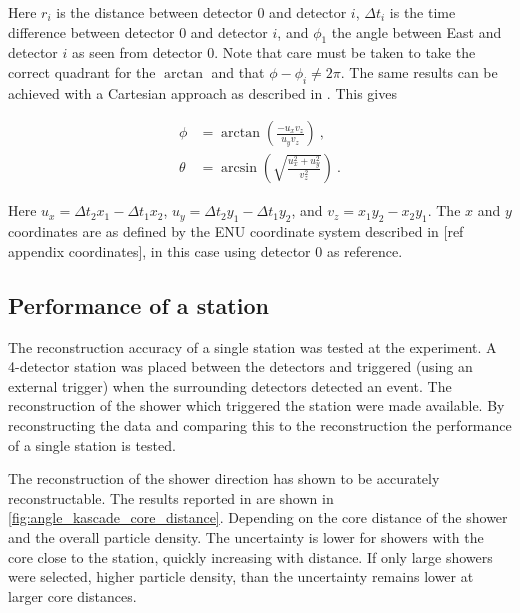 Here $r_i$ is the distance between detector 0 and detector $i$, $\Delta t_i$ is the time difference between detector 0 and detector $i$, and $\phi_1$ the angle between East and detector $i$ as seen from detector 0. Note that care must be taken to take the correct quadrant for the $\arctan$ and that $\phi - \phi_i \ne 2 \pi$. The same results can be achieved with a Cartesian approach as described in \cite{montanus2015direction}. This gives

\begin{equation}
    \label{eq:direction-2dflat}
    \begin{split}
        \phi &= \arctan \left(\frac{-u_x v_z}{u_y v_z} \right) \ , \\
        \theta &= \arcsin \left(\sqrt{\frac{u_x^2+u_y^2}{v_z^2}} \right) \ .
    \end{split}
\end{equation}

Here $u_x = \Delta t_2 x_1 - \Delta t_1 x_2$, $u_y = \Delta t_2 y_1 - \Delta t_1 y_2$, and $v_z = x_1 y_2 - x_2 y_1$. The $x$ and $y$ coordinates are as defined by the ENU coordinate system described in [ref appendix coordinates], in this case using detector 0 as reference.


\subsection{Performance of a station}

The reconstruction accuracy of a single \hisparc station was tested at the \kascade experiment. A 4-detector \hisparc station was placed between the \kascade detectors and triggered (using an external trigger) when the surrounding \kascade detectors detected an event. The \kascade reconstruction of the shower which triggered the \hisparc station were made available. By reconstructing the \hisparc data and comparing this to the \kascade reconstruction the performance of a single station is tested.

The reconstruction of the shower direction has shown to be accurately reconstructable. The results reported in \cite{fokkema2012hisparc} are shown in \cref{fig:angle_kascade_core_distance}. Depending on the core distance of the shower and the overall particle density. The uncertainty is lower for showers with the core close to the station, quickly increasing with distance. If only large showers were selected, higher particle density, than the uncertainty remains lower at larger core distances.

